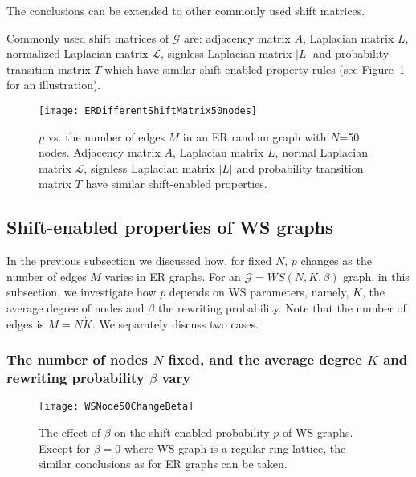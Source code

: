 \documentclass[journal]{IEEEtran}
\begin{document}
The conclusions can be extended to other commonly used shift matrices.
\begin{Rem}
		Commonly used shift matrices of $\mathcal{G}$ are: adjacency matrix $A$, %
		Laplacian matrix $L$, normalized Laplacian matrix $\mathcal{L}$, signless Laplacian matrix $|L|$ and probability transition matrix $T$ which have similar shift-enabled property rules (see Figure~\ref{fig:different shift matrix} for an illustration).
	\begin{figure}[htb]
		\centering
		\texttt{[image: ERDifferentShiftMatrix50nodes]}
		\caption{$p$ vs. the number of edges $M$ in an ER random graph with $N$=50 nodes. Adjacency matrix $A$, Laplacian matrix $L$, normal Laplacian matrix $\mathcal{L}$,  signless Laplacian matrix $|L|$ and probability transition matrix $T$ have similar shift-enabled properties.}
		 	\label{fig:different shift matrix}
	\end{figure}
\end{Rem}
\subsection{Shift-enabled properties of WS graphs}
In the previous subsection we discussed how, for fixed $N$, $p$ changes as the number of edges $M$ varies in ER graphs. For an $\mathcal{G}=WS(N, K,\beta)$ graph, in this subsection, we investigate how $p$ depends on WS parameters, namely, $K$, the average degree of nodes and $\beta$ the rewriting probability. Note that the number of edges is $M=N\dot K$. We separately discuss two cases. 
\subsubsection{The number of nodes $N$ fixed, and the average degree $K$ and rewriting probability $\beta$ vary}


\begin{figure}[htb]
	\centering
	\texttt{[image: WSNode50ChangeBeta]}
	\caption{The effect of $\beta$ on the shift-enabled probability $p$ of WS graphs. Except for $\beta=0$ where WS graph is a regular ring lattice, the similar conclusions as for ER graphs can be taken. 
	}
	\label{fig:nodes20changebetalap}
\end{figure}
\end{document}
